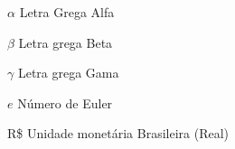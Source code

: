 \documentclass[
  12pt,		%
  a4paper,	%
  openright,%
  oneside,	%
  chapter=TITLE,		%
  section=TITLE,		%
  english,	%
  french,	%
  spanish,	%
  brazil	%
]{abntex2}
\begin{document}
    
    \begin{simbolos}
        \item[$\alpha$] Letra Grega Alfa
        \item[$\beta$] Letra grega Beta
        \item[$\gamma$] Letra grega Gama
        \item[$e$] Número de Euler
        \item[R\$] Unidade monetária Brasileira (Real)
    \end{simbolos}
    
    
    \tableofcontents*
    \newpage
    
    
    \textual
    \pagestyle{simple} 
    
    
\end{document}

